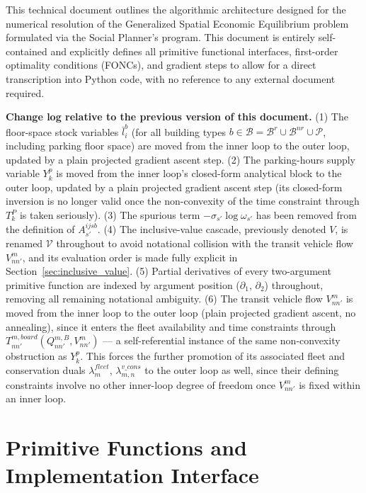 \documentclass[11pt,a4paper]{article}
\newcommand{\IV}{\mathcal{V}}
\begin{document}
This technical document outlines the algorithmic architecture designed for the numerical resolution of the Generalized Spatial Economic Equilibrium problem formulated via the Social Planner's program. This document is entirely self-contained and explicitly defines all primitive functional interfaces, first-order optimality conditions (FONCs), and gradient steps to allow for a direct transcription into Python code, with no reference to any external document required.

\tableofcontents

\bigskip

\noindent\textbf{Change log relative to the previous version of this document.} (1) The floor-space stock variables $\bar l_i^b$ (for all building types $b \in \mathcal{B} = \mathcal{B}^r \cup \mathcal{B}^{nr} \cup \mathcal{P}$, including parking floor space) are moved from the inner loop to the outer loop, updated by a plain projected gradient ascent step. (2) The parking-hours supply variable $Y_k^p$ is moved from the inner loop's closed-form analytical block to the outer loop, updated by a plain projected gradient ascent step (its closed-form inversion is no longer valid once the non-convexity of the time constraint through $T^P_k$ is taken seriously). (3) The spurious term $-\sigma_{s'}\log\omega_{s'}$ has been removed from the definition of $A^{ijsb}_{s'}$. (4) The inclusive-value cascade, previously denoted $V$, is renamed $\IV$ throughout to avoid notational collision with the transit vehicle flow $V^m_{nn'}$, and its evaluation order is made fully explicit in Section~\ref{sec:inclusive_value}. (5) Partial derivatives of every two-argument primitive function are indexed by argument position ($\partial_1$, $\partial_2$) throughout, removing all remaining notational ambiguity. (6) The transit vehicle flow $V^m_{nn'}$ is moved from the inner loop to the outer loop (plain projected gradient ascent, no annealing), since it enters the fleet availability and time constraints through $T^{m,board}_{nn'}(Q^{m,B}_{nn'}, V^m_{nn'})$ — a self-referential instance of the same non-convexity obstruction as $Y_k^p$. This forces the further promotion of its associated fleet and conservation duals $\lambda^{fleet}_m$, $\lambda^{v\_cons}_{m,n}$ to the outer loop as well, since their defining constraints involve no other inner-loop degree of freedom once $V^m_{nn'}$ is fixed within an inner loop.

\section{Primitive Functions and Implementation Interface}
\label{sec:primitives}
\end{document}
